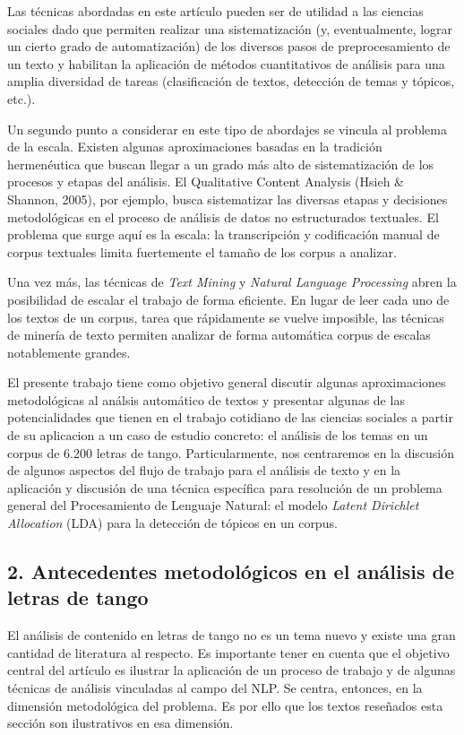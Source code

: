\documentclass[]{article}
\begin{document}
Las técnicas abordadas en este artículo pueden ser de utilidad a las
ciencias sociales dado que permiten realizar una sistematización (y,
eventualmente, lograr un cierto grado de automatización) de los diversos
pasos de preprocesamiento de un texto y habilitan la aplicación de
métodos cuantitativos de análisis para una amplia diversidad de tareas
(clasificación de textos, detección de temas y tópicos, etc.).

Un segundo punto a considerar en este tipo de abordajes se vincula al
problema de la escala. Existen algunas aproximaciones basadas en la
tradición hermenéutica que buscan llegar a un grado más alto de
sistematización de los procesos y etapas del análisis. El Qualitative
Content Analysis (Hsieh \& Shannon, 2005), por ejemplo, busca
sistematizar las diversas etapas y decisiones metodológicas en el
proceso de análisis de datos no estructurados textuales. El problema que
surge aquí es la escala: la transcripción y codificación manual de
corpus textuales limita fuertemente el tamaño de los corpus a analizar.

Una vez más, las técnicas de \emph{Text Mining} y \emph{Natural Language
Processing} abren la posibilidad de escalar el trabajo de forma
eficiente. En lugar de leer cada uno de los textos de un corpus, tarea
que rápidamente se vuelve imposible, las técnicas de minería de texto
permiten analizar de forma automática corpus de escalas notablemente
grandes.

El presente trabajo tiene como objetivo general discutir algunas
aproximaciones metodológicas al análsis automático de textos y presentar
algunas de las potencialidades que tienen en el trabajo cotidiano de las
ciencias sociales a partir de su aplicacion a un caso de estudio
concreto: el análisis de los temas en un corpus de 6.200 letras de
tango. Particularmente, nos centraremos en la discusión de algunos
aspectos del flujo de trabajo para el análisis de texto y en la
aplicación y discusión de una técnica específica para resolución de un
problema general del Procesamiento de Lenguaje Natural: el modelo
\emph{Latent Dirichlet Allocation} (LDA) para la detección de tópicos en
un corpus.

\subsection{2. Antecedentes metodológicos en el análisis de letras de
tango}\label{antecedentes-metodoluxf3gicos-en-el-anuxe1lisis-de-letras-de-tango}

El análisis de contenido en letras de tango no es un tema nuevo y existe
una gran cantidad de literatura al respecto. Es importante tener en
cuenta que el objetivo central del artículo es ilustrar la aplicación de
un proceso de trabajo y de algunas técnicas de análisis vinculadas al
campo del NLP. Se centra, entonces, en la dimensión metodológica del
problema. Es por ello que los textos reseñados esta sección son
ilustrativos en esa dimensión.
\end{document}
